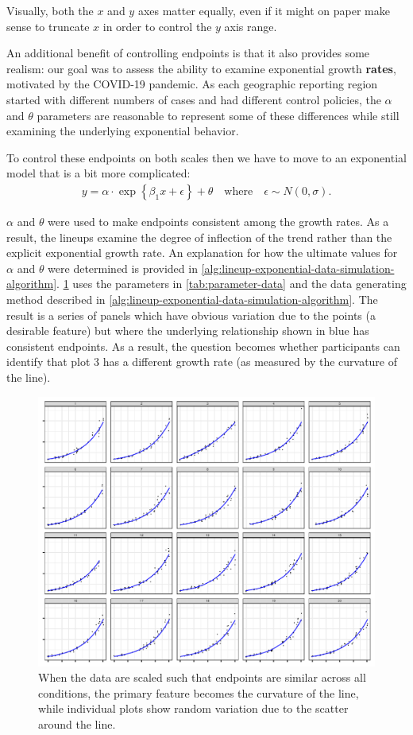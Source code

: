 \documentclass[12pt]{article}
\begin{document}
Visually, both the \(x\) and \(y\) axes matter equally, even if it might
on paper make sense to truncate \(x\) in order to control the \(y\) axis
range.

An additional benefit of controlling endpoints is that it also provides
some realism: our goal was to assess the ability to examine exponential
growth \textbf{rates}, motivated by the COVID-19 pandemic. As each
geographic reporting region started with different numbers of cases and
had different control policies, the \(\alpha\) and \(\theta\) parameters
are reasonable to represent some of these differences while still
examining the underlying exponential behavior.

To control these endpoints on both scales then we have to move to an
exponential model that is a bit more complicated:
\begin{align}y = \alpha \cdot \exp\left\{\beta_1 x + \epsilon\right\} + \theta\quad \text{where}\quad \epsilon \sim N(0, \sigma).\label{eq:complexexp}\end{align}

\(\alpha\) and \(\theta\) were used to make endpoints consistent among
the growth rates. As a result, the lineups examine the degree of
inflection of the trend rather than the explicit exponential growth
rate. An explanation for how the ultimate values for \(\alpha\) and
\(\theta\) were determined is provided in
\cref{alg:lineup-exponential-data-simulation-algorithm}.
\cref{fig:lineup-scale-data} uses the parameters in
\cref{tab:parameter-data} and the data generating method described in
\cref{alg:lineup-exponential-data-simulation-algorithm}. The result is a
series of panels which have obvious variation due to the points (a
desirable feature) but where the underlying relationship shown in blue
has consistent endpoints. As a result, the question becomes whether
participants can identify that plot 3 has a different growth rate (as
measured by the curvature of the line).

\begin{figure}[tbp]

{\centering \includegraphics[width=.6\linewidth,]{appendix_files/figure-latex/lineup-scale-data-1} 

}

\caption{When the data are scaled such that endpoints are similar across all conditions, the primary feature becomes the curvature of the line, while individual plots show random variation due to the scatter around the line.}\label{fig:lineup-scale-data}
\end{figure}
\end{document}
